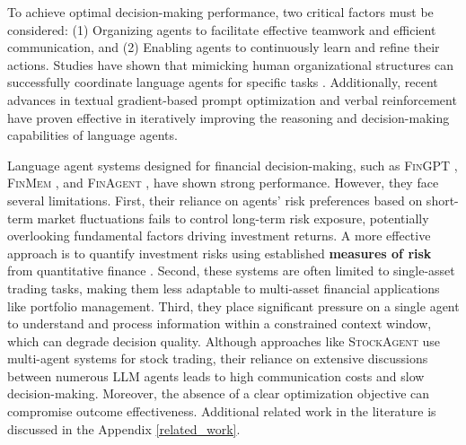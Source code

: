 To achieve optimal decision-making performance, two critical factors must be considered: (1) Organizing agents to facilitate effective teamwork and efficient communication, and (2) Enabling agents to continuously learn and refine their actions. Studies have shown that mimicking human organizational structures can successfully coordinate language agents for specific tasks \cite{guo2024embodied, li2024agent, chen2023agentverse}. Additionally, recent advances in textual gradient-based prompt optimization \cite{pryzant2023automatic, tang2024unleashing} and verbal reinforcement \cite{yao2023retroformer, shinn2024reflexion} have proven effective in iteratively improving the reasoning and decision-making capabilities of language agents.

Language agent systems designed for financial decision-making, such as \textsc{FinGPT} \cite{yang2023fingpt}, \textsc{FinMem} \cite{yu2023finmem}, and \textsc{FinAgent} \cite{zhang2024finagent}, have shown strong performance. However, they face several limitations. First, their reliance on agents' risk preferences based on short-term market fluctuations fails to control long-term risk exposure, potentially overlooking fundamental factors driving investment returns. A more effective approach is to quantify investment risks using established \textbf{measures of risk} from quantitative finance \cite{delbaen2000coherent, fabozzi2010quantitative}. Second, these systems are often limited to single-asset trading tasks, making them less adaptable to multi-asset financial applications like portfolio management. Third, they place significant pressure on a single agent to understand and process information within a constrained context window, which can degrade decision quality. Although approaches like \textsc{StockAgent} \cite{liuai} use multi-agent systems for stock trading, their reliance on extensive discussions between numerous LLM agents leads to high communication costs and slow decision-making. Moreover, the absence of a clear optimization objective can compromise outcome effectiveness. Additional related work in the literature is discussed in the Appendix \ref{related_work}.

